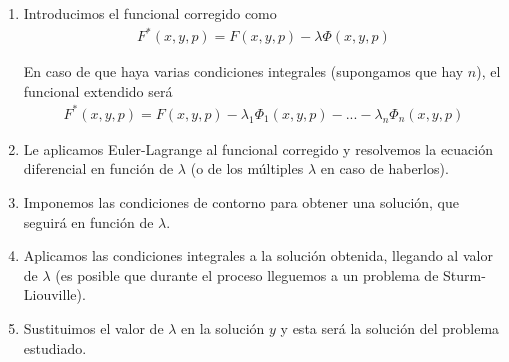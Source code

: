 \documentclass[12pt]{book}
\begin{document}
    \begin{enumerate}
        \item Introducimos el funcional corregido como 
        \begin{gather*}
            F^*(x,y,p) = F(x,y,p) - \lambda \Phi(x,y,p)
        \end{gather*}

        En caso de que haya varias condiciones integrales (supongamos que hay $n$), el funcional extendido será
        \begin{gather*}
            F^*(x,y,p) = F(x,y,p) - \lambda_1 \Phi_1(x,y,p) - ... - \lambda_n \Phi_n(x,y,p)
        \end{gather*}
        \item Le aplicamos Euler-Lagrange al funcional corregido y resolvemos la ecuación diferencial en función de $\lambda$ (o de los múltiples $\lambda$ en caso de haberlos). 
        \item Imponemos las condiciones de contorno para obtener una solución, que seguirá en función de $\lambda$.
        \item Aplicamos las condiciones integrales a la solución obtenida, llegando al valor de $\lambda$ (es posible que durante el proceso lleguemos a un problema de Sturm-Liouville).
        \item Sustituimos el valor de $\lambda$ en la solución $y$ y esta será la solución del problema estudiado.
    \end{enumerate}
 
\end{document}
